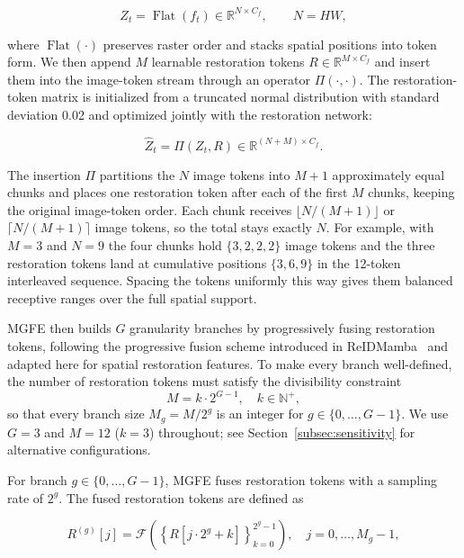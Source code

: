 \documentclass[symmetry,article,submit,pdftex,moreauthors]{Definitions/mdpi}
\begin{document}
\begin{equation}
Z_t = \operatorname{Flat}(f_t) \in \mathbb{R}^{N \times C_f},
\qquad
N = H W,
\end{equation}

where $\operatorname{Flat}(\cdot)$ preserves raster order and stacks spatial positions into token form. We then append $M$ learnable restoration tokens $R \in \mathbb{R}^{M \times C_f}$ and insert them into the image-token stream through an operator $\Pi(\cdot,\cdot)$. The restoration-token matrix is initialized from a truncated normal distribution with standard deviation 0.02 and optimized jointly with the restoration network:

\begin{equation}
\widehat{Z}_t = \Pi(Z_t, R) \in \mathbb{R}^{(N+M)\times C_f}.
\end{equation}

The insertion $\Pi$ partitions the $N$ image tokens into $M{+}1$ approximately equal chunks and places one restoration token after each of the first $M$ chunks, keeping the original image-token order. Each chunk receives $\lfloor N/(M{+}1)\rfloor$ or $\lceil N/(M{+}1)\rceil$ image tokens, so the total stays exactly $N$. For example, with $M=3$ and $N=9$ the four chunks hold $\{3,2,2,2\}$ image tokens and the three restoration tokens land at cumulative positions $\{3,6,9\}$ in the 12-token interleaved sequence. Spacing the tokens uniformly this way gives them balanced receptive ranges over the full spatial support.

MGFE then builds $G$ granularity branches by progressively fusing restoration tokens, following the progressive fusion scheme introduced in ReIDMamba~\cite{gu2025reidmamba} and adapted here for spatial restoration features. To make every branch well-defined, the number of restoration tokens must satisfy the divisibility constraint
\begin{equation}
M = k \cdot 2^{G-1},\quad k \in \mathbb{N}^{+},
\end{equation}
so that every branch size $M_g = M/2^g$ is an integer for $g\in\{0,\ldots,G-1\}$. We use $G=3$ and $M=12$ ($k=3$) throughout; see Section~\ref{subsec:sensitivity} for alternative configurations.

For branch $g \in \{0,\ldots,G-1\}$, MGFE fuses restoration tokens with a sampling rate of $2^g$. The fused restoration tokens are defined as

\begin{equation}
R^{(g)}[j] =
\mathcal{F}\!\left(
\left\{R[j{\cdot}2^g+k]\right\}_{k=0}^{2^g-1}
\right),\quad
j = 0,\ldots,M_g-1,
\end{equation}
\end{document}

